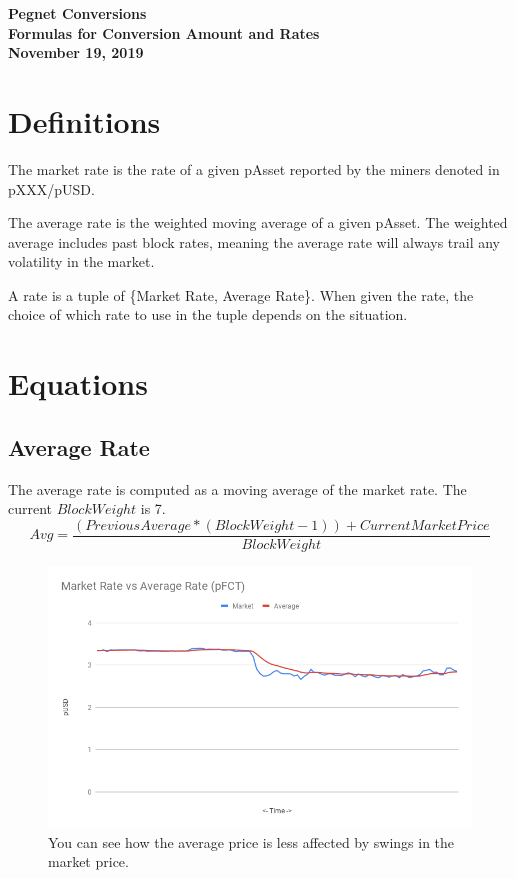 \documentclass[12pt]{article}
\begin{document}
\begin{center}
{\bf 
Pegnet Conversions \\
Formulas for Conversion Amount and Rates\\
November 19, 2019\\
}

\end{center}

\section{Definitions}

\begin{description}[font=\sffamily\bfseries, leftmargin=1cm, style=nextline]
    \item[Market Rate]
    The market rate is the rate of a given pAsset reported by the miners denoted in pXXX/pUSD.
    \item[Average Rate]
    The average rate is the weighted moving average of a given pAsset. The weighted average includes past block rates, meaning the average rate will always trail any volatility in the market.
    \item[Rate]
    A rate is a tuple of \{Market Rate, Average Rate\}. When given the rate, the choice of which rate to use in the tuple depends on the situation.
\end{description}

\pagebreak
\section{Equations}

\subsection{Average Rate}

The average rate is computed as a moving average of the market rate. The current $BlockWeight$ is 7.
    \large{\[
    Avg = \frac{(Previous Average * (BlockWeight-1)) + Current Market Price}{BlockWeight}
    \]}

\begin{figure}[h!]
  \includegraphics[width=\textwidth]{rategraph.png}
  \caption{You can see how the average price is less affected by swings in the market price.}
\end{figure}
\end{document}
